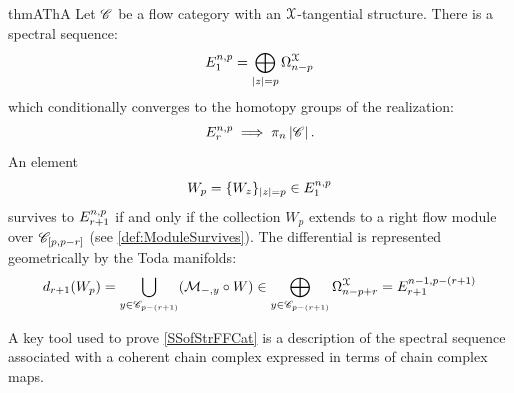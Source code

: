 \newpage
\begin{restatable}{thmA}{ThA}\label{SSofStrFFCat}
    Let $\mathscr{C}$ be a flow category with an $\EuScript{X}$-tangential structure. There is a spectral sequence:
    \begin{equation*}
        E_{1}^{n,p} = \bigoplus_{\left\lvert z\right\rvert=p} \Omega^{\EuScript{X}}_{n-p}
    \end{equation*}
    which conditionally converges to the homotopy groups of the realization:
    \begin{equation*}
        E_r^{n,p} \implies \pi_n \left\lvert\mathscr{C}\right\rvert.
    \end{equation*}
    An element
    \begin{equation*}
        W_p=\{W_z\}_{\left\lvert z\right\rvert=p} \in E_{1}^{n,p}
    \end{equation*}
    survives to $E_{r+1}^{n,p}$ if and only if the collection $W_p$ extends to a right flow module over $\mathscr{C}_{[p,p-r]}$ (see \cref{def:ModuleSurvives}). The differential is represented geometrically by the Toda manifolds:
    \begin{equation*}
        d_{r+1}(W_p) = \bigcup_{y \in \mathscr{C}_{p-(r+1)}} (\mathcal{M}_{-,y} \circ W) \in \bigoplus_{y \in \mathscr{C}_{p-(r+1)}} \Omega^{\EuScript{X}}_{n-p+r} = E_{r+1}^{n-1,p-(r+1)}
    \end{equation*}
\end{restatable}

A key tool used to prove \cref{SSofStrFFCat} is a description of the spectral sequence associated with a coherent chain complex expressed in terms of chain complex maps.

